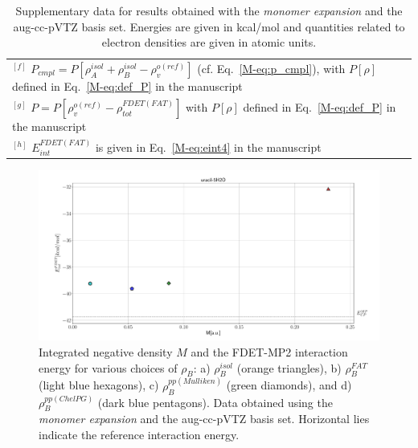 \documentclass[amsmath,amssymb,preprint,aip,jcp]{revtex4-1}
\begin{document}
\begin{table}[H]
\begin{center}
{\begin{tabular}{|l|l|l|l|l|l|l|l|l|l|}
\multicolumn{10}{p{1.0\textwidth}}{$^{[f]}$ $P_{cmpl}=P[\rho_A^{isol}+\rho_B^{isol} - \rho_v^{o(ref)}]$ (cf. Eq.~\ref{M-eq:p_cmpl}), with $P[\rho]$ defined in Eq.~\ref{M-eq:def_P} in the manuscript}\\
\multicolumn{10}{p{1.0\textwidth}}{$^{[g]}$ $P=P[\rho_v^{o(ref)} - \rho_{tot}^{FDET(FAT)}]$ with $P[\rho]$ defined in Eq.~\ref{M-eq:def_P} in the manuscript}\\
\multicolumn{10}{p{1.0\textwidth}}{$^{[h]}$ $E^{FDET(FAT)}_{int}$ is given in Eq.~\ref{M-eq:eint4} in the manuscript}\\
\end{tabular}
}
\end{center}
\caption{Supplementary data for results obtained with the \textit{monomer expansion} and the aug-cc-pVTZ basis set. Energies are given in kcal/mol and quantities related to electron densities are given in atomic units.}
\end{table}

\begin{figure}
\centering
\includegraphics[width=1.0\linewidth]{M_vs_MP_augccpVTZ.pdf}
\caption{Integrated negative density $M$ and the FDET-MP2 interaction energy for various choices of $\rho_B$: a) $\rho_B^{isol}$ (orange triangles), b) $\rho_B^{FAT}$ (light blue hexagons), c) $\rho_B^{pp(Mulliken)}$ (green diamonds), and d) $\rho_B^{pp(ChelPG)}$ (dark blue pentagons). Data obtained using the {\it monomer expansion} and the aug-cc-pVTZ basis set. Horizontal lies indicate the reference interaction energy.}
\label{fig:M_vs_MP_augccpVTZ}
\end{figure}
\end{document}
